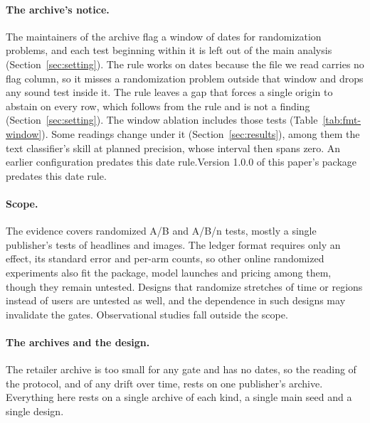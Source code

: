 \paragraph{The archive's notice.}
The maintainers of the archive flag a window of dates for randomization problems, and each test beginning within it is left out of the main analysis (Section~\ref{sec:setting}). The rule works on dates because the file we read carries no flag column, so it misses a randomization problem outside that window and drops any sound test inside it. The rule leaves a gap that forces a single origin to abstain on every row, which follows from the rule and is not a finding (Section~\ref{sec:setting}). The window ablation includes those tests (Table~\ref{tab:fmt-window}). Some readings change under it (Section~\ref{sec:results}), among them the text classifier's skill at planned precision, whose interval then spans zero. \iftmlr An earlier configuration predates this date rule.\else Version 1.0.0 of this paper's package predates this date rule.\fi

\paragraph{Scope.}
The evidence covers randomized A/B and A/B/n tests, mostly a single publisher's tests of headlines and images. The ledger format requires only an effect, its standard error and per-arm counts, so other online randomized experiments also fit the package, model launches and pricing among them, though they remain untested. Designs that randomize stretches of time or regions instead of users are untested as well, and the dependence in such designs may invalidate the gates. Observational studies fall outside the scope.

\paragraph{The archives and the design.} The retailer archive is too small for any gate and has no dates, so the reading of the protocol, and of any drift over time, rests on one publisher's archive. Everything here rests on a single archive of each kind, a single main seed and a single design.

